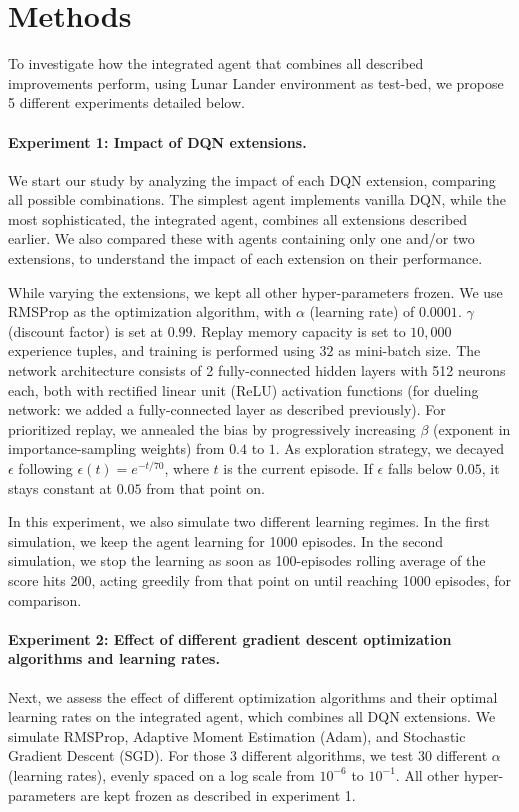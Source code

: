 \documentclass{article}
\begin{document}
    \section{Methods}
    \label{sec:methods}
    To investigate how the integrated agent that combines all described improvements perform, using Lunar Lander environment as test-bed, we propose 5 different experiments detailed below.

    \paragraph{Experiment 1: Impact of DQN extensions.}
    We start our study by analyzing the impact of each DQN extension, comparing all possible combinations.
    The simplest agent implements vanilla DQN, while the most sophisticated, the integrated agent, combines all extensions described earlier.
    We also compared these with agents containing only one and/or two extensions, to understand the impact of each extension on their performance.

    While varying the extensions, we kept all other hyper-parameters frozen.
    We use RMSProp as the optimization algorithm, with $\alpha$ (learning rate) of $0.0001$.
    $\gamma$ (discount factor) is set at $0.99$.
    Replay memory capacity is set to $10,000$ experience tuples, and training is performed using $32$ as mini-batch size.
    The network architecture consists of 2 fully-connected hidden layers with 512 neurons each, both with rectified linear unit (ReLU) activation functions (for dueling network: we added a fully-connected layer as described previously).
    For prioritized replay, we annealed the bias by progressively increasing $\beta$ (exponent in importance-sampling weights) from $0.4$ to $1$.
    As exploration strategy, we decayed $\epsilon$ following $\epsilon(t) = e^{-t/70}$, where $t$ is the current episode.
    If $\epsilon$ falls below $0.05$, it stays constant at $0.05$ from that point on.

    In this experiment, we also simulate two different learning regimes.
    In the first simulation, we keep the agent learning for 1000 episodes.
    In the second simulation, we stop the learning as soon as 100-episodes rolling average of the score hits 200, acting greedily from that point on until reaching 1000 episodes, for comparison.

    \paragraph{Experiment 2: Effect of different gradient descent optimization algorithms and learning rates.}
    Next, we assess the effect of different optimization algorithms and their optimal learning rates on the integrated agent, which combines all DQN extensions.
    We simulate RMSProp, Adaptive Moment Estimation (Adam), and Stochastic Gradient Descent (SGD).
    For those 3 different algorithms, we test $30$ different $\alpha$ (learning rates), evenly spaced on a log scale from $10^{-6}$ to $10^{-1}$.
    All other hyper-parameters are kept frozen as described in experiment 1.
\end{document}

